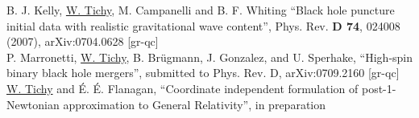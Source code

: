 B. J. Kelly, \underline{W. Tichy}, M. Campanelli and B. F. Whiting
``Black hole puncture initial data with realistic gravitational wave content'',
Phys. Rev. {\bf D 74}, 024008 (2007), arXiv:0704.0628 [gr-qc]
\\

P. Marronetti, \underline{W. Tichy}, B. Br\"ugmann, J. Gonzalez, 
and U. Sperhake, ``High-spin binary black hole mergers'',
submitted to Phys. Rev. D, arXiv:0709.2160 [gr-qc]
\\


\underline{W. Tichy} and \'E. \'E. Flanagan,
``Coordinate independent formulation of post-1-Newtonian approximation  
to General Relativity'', 
in preparation 
\\



%

